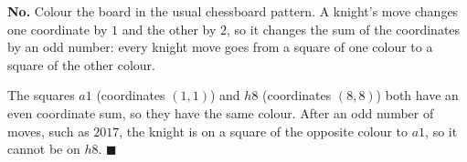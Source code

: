 \textbf{No.} Colour the board in the usual chessboard pattern. A knight's move changes one coordinate by $1$ and the other by $2$, so it changes the sum of the coordinates by an odd number: every knight move goes from a square of one colour to a square of the other colour.

The squares $a1$ (coordinates $(1,1)$) and $h8$ (coordinates $(8,8)$) both have an even coordinate sum, so they have the same colour. After an odd number of moves, such as $2017$, the knight is on a square of the opposite colour to $a1$, so it cannot be on $h8$. $\blacksquare$
